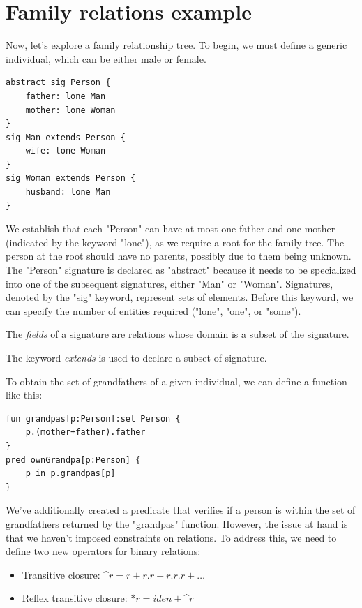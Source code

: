 \documentclass[12pt, a4paper]{report}
\begin{document}
        \section{Family relations example}
        Now, let's explore a family relationship tree. 
        To begin, we must define a generic individual, which can be either male or female.        
        \begin{lstlisting}[language=alloy]
abstract sig Person {
    father: lone Man
    mother: lone Woman
}
sig Man extends Person {
    wife: lone Woman
}
sig Woman extends Person {
    husband: lone Man
}
        \end{lstlisting}
        We establish that each "Person" can have at most one father and one mother (indicated by the keyword "lone"), as we require a root for the family tree. 
        The person at the root should have no parents, possibly due to them being unknown. 
        The "Person" signature is declared as "abstract" because it needs to be specialized into one of the subsequent signatures, either "Man" or "Woman". 
        Signatures, denoted by the "sig" keyword, represent sets of elements. 
        Before this keyword, we can specify the number of entities required ("lone", "one", or "some").
        \begin{definition}
            The \emph{fields} of a signature are relations whose domain is a subset of the signature. 
            
            The keyword \emph{extends} is used to declare a subset of signature. 
        \end{definition}
        To obtain the set of grandfathers of a given individual, we can define a function like this:
        \begin{lstlisting}[language=alloy]
fun grandpas[p:Person]:set Person {
    p.(mother+father).father
}
pred ownGrandpa[p:Person] {
    p in p.grandpas[p]
}
        \end{lstlisting}
        We've additionally created a predicate that verifies if a person is within the set of grandfathers returned by the "grandpas" function. 
        However, the issue at hand is that we haven't imposed constraints on relations. 
        To address this, we need to define two new operators for binary relations:
        \begin{itemize}
            \item Transitive closure: \textasciicircum $r=r+r.r+r.r.r+\dots$
            \item Reflex transitive closure: $*r=iden+$\textasciicircum$r$
        \end{itemize}
\end{document}
